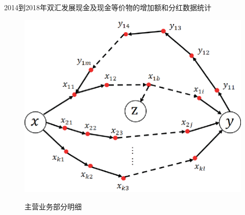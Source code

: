 {\begin{table}[H]
\caption{2014到2018年双汇发展现金及现金等价物的增加额和分红数据统计}
\label{shuanghui_xianjinjixianjindengjiawu_fenhong}
\centering
\scalebox{0.65}{

}
\end{table}



\begin{figure}[!htbp]
  \centering
  \includegraphics[width=1\textwidth]{figures/1.eps}\\
  \caption{主营业务部分明细}\label{shuanghui_zhuyingzengzhang}
\end{figure}



}
